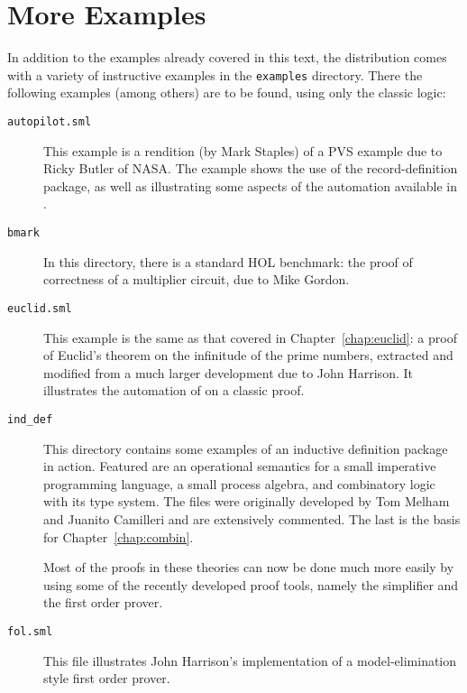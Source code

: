 
\chapter{More Examples}
\label{chap:more-examples}

In addition to the examples already covered in this text, the \holn{}
distribution comes with a variety of instructive examples in the
\verb|examples| directory.  There the following examples (among
others) are to be found, using only the classic \HOL{} logic:

\begin{description}

\item [\tt autopilot.sml]

  This example is a \holn{} rendition (by Mark Staples) of a PVS
  example due to Ricky Butler of NASA. The example shows the use of
  the record-definition package, as well as illustrating some aspects
  of the automation available in \holn{}.

\item [\tt bmark]

  In this directory, there is a standard HOL benchmark: the proof of
  correctness of a multiplier circuit, due to Mike Gordon.

\item [\tt euclid.sml]

  This example is the same as that covered in
  Chapter~\ref{chap:euclid}: a proof of Euclid's theorem on the
  infinitude of the prime numbers, extracted and modified from a much
  larger development due to John Harrison. It illustrates the
  automation of \HOL{} on a classic proof.

\item[\tt ind\_def]

This directory contains some examples of an inductive definition package
in action. Featured are an operational semantics for a small imperative
programming language, a small process algebra, and combinatory logic
with its type system. The files were originally developed by Tom Melham
and Juanito Camilleri and are extensively commented.  The last is the
basis for Chapter~\ref{chap:combin}.

Most of the proofs in these theories can now be done much more easily by
using some of the recently developed proof tools, namely the simplifier
and the first order prover.

\item [\tt fol.sml]

  This file illustrates John Harrison's implementation of a
  model-elimination style first order prover.


\end{description}
